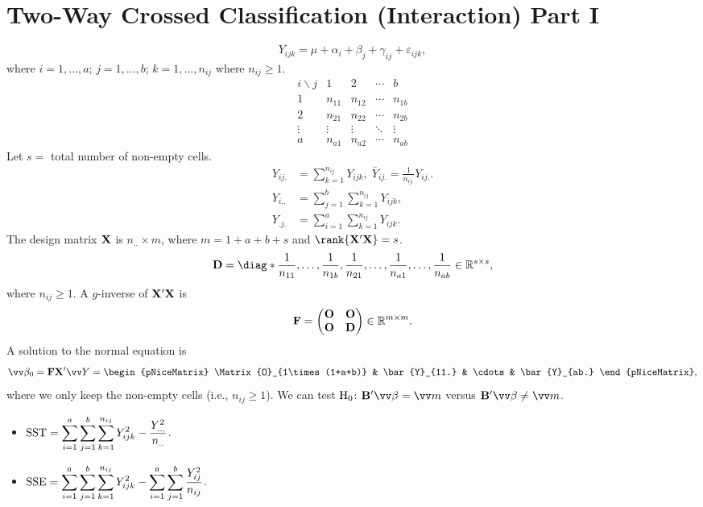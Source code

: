 \section*{Two-Way Crossed Classification (Interaction) Part I}
\[ Y_{ijk}=\mu+\alpha_i+\beta_j+\gamma_{ij}+\varepsilon_{ijk}, \]
where $ i=1,\ldots,a $; $ j=1,\ldots,b $;
$ k=1,\ldots,n_{ij} $ where $ n_{ij}\ge 1 $.
\[ \begin{array}{c|cccc}
        i\backslash j & 1      & 2      & \cdots & b      \\
        \hline
        1             & n_{11} & n_{12} & \cdots & n_{1b} \\
        2             & n_{21} & n_{22} & \cdots & n_{2b} \\
        \vdots        & \vdots & \vdots & \ddots & \vdots \\
        a             & n_{a1} & n_{a2} & \cdots & n_{ab}
    \end{array} \]
Let $ s= $ total number of non-empty cells.
\begin{align*}
    Y_{ij.} & =\sum_{k=1}^{n_{ij}}Y_{ijk},\; \bar{Y}_{ij.}=\frac{1}{n_{ij.}}Y_{ij.}. \\
    Y_{i..} & =\sum_{j=1}^{b}\sum_{k=1}^{n_{ij}}Y_{ijk},                             \\
    Y_{.j.} & =\sum_{i=1}^{a}\sum_{k=1}^{n_{ij}}Y_{ijk}.
\end{align*}
The design matrix $ \mathbf{X} $ is $ n_{..}\times m $,
where $ m=1+a+b+s $ and $ \rank{\Matrix{X}'\Matrix{X}}=s $.
\[ \Matrix{D}=\diag*{\frac{1}{n_{11}},\ldots,\frac{1}{n_{1b}},\frac{1}{n_{21}},\ldots,\frac{1}{n_{a1}},\ldots,\frac{1}{n_{ab}}}\in\R^{s\times s}, \]
where $ n_{ij}\ge 1 $. A $ g $-inverse of $ \mathbf{X}'\mathbf{X} $ is
\[ \mathbf{F}=\begin{pmatrix}
        \mathbf{O} & \mathbf{O} \\
        \mathbf{O} & \mathbf{D}
    \end{pmatrix}\in\mathbb{R}^{m\times m}. \]
A solution to the normal equation is
\[ \Vector{\beta}_0=\Matrix{F}\Matrix{X}'\Vector{Y}=\begin{pNiceMatrix}
        \Matrix{O}_{1\times(1+a+b)} & \bar{Y}_{11.} & \cdots & \bar{Y}_{ab.}
    \end{pNiceMatrix}, \]
where we only keep the non-empty cells (i.e., $ n_{ij}\ge 1 $).
We can test $ \text{H}_0 $: $ \Matrix{B}'\Vector{\beta}=\Vector{m} $
versus $ \Matrix{B}'\Vector{\beta}\ne \Vector{m} $.
\begin{itemize}
    \item $ \displaystyle \text{SST} =\sum_{i=1}^{a}\sum_{j=1}^{b}\sum_{k=1}^{n_{ij}}Y_{ijk}^2-\frac{Y_{...}^2}{n_{..}} $.
    \item $ \displaystyle \text{SSE} =\sum_{i=1}^{a}\sum_{j=1}^{b}\sum_{k=1}^{n_{ij}}Y_{ijk}^2-\sum_{i=1}^{a}\sum_{j=1}^{b}\frac{Y_{ij}^2}{n_{ij}} $.
\end{itemize}
